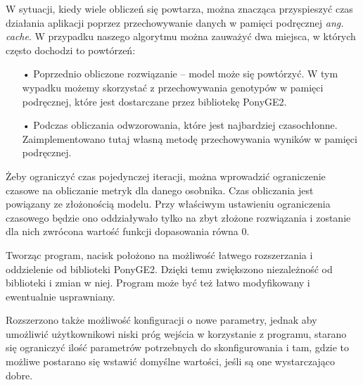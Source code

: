 W sytuacji, kiedy wiele obliczeń się powtarza, można znacząca przyspieszyć czas działania aplikacji poprzez przechowywanie danych w pamięci podręcznej \textit{ang. cache}. W przypadku naszego algorytmu można zauważyć dwa miejsca, w których często dochodzi to powtórzeń:
\begin{itemize}
  \item[•] Poprzednio obliczone rozwiązanie -- model może się powtórzyć. W tym wypadku możemy skorzystać z przechowywania genotypów w pamięci podręcznej, które jest dostarczane przez bibliotekę PonyGE2.
  \item[•] Podczas obliczania odwzorowania, które jest najbardziej czasochłonne. Zaimplementowano tutaj własną metodę przechowywania wyników w pamięci podręcznej.
\end{itemize}

Żeby ograniczyć czas pojedynczej iteracji, można wprowadzić ograniczenie czasowe na obliczanie metryk dla danego osobnika. Czas obliczania jest powiązany ze złożonością modelu. Przy właściwym ustawieniu ograniczenia czasowego będzie ono oddziaływało tylko na zbyt złożone rozwiązania i zostanie dla nich zwrócona wartość funkcji dopasowania równa 0.

Tworząc program, nacisk położono na możliwość łatwego rozszerzania i oddzielenie od biblioteki PonyGE2. Dzięki temu zwiększono niezależność od biblioteki i zmian w niej. Program może być też łatwo modyfikowany i ewentualnie usprawniany. 

Rozszerzono także możliwość konfiguracji o nowe parametry, jednak aby umożliwić użytkownikowi niski próg wejścia w korzystanie z programu, starano się ograniczyć ilość parametrów potrzebnych do skonfigurowania i tam, gdzie to możliwe postarano się wstawić domyślne wartości, jeśli są one wystarczająco dobre. 


